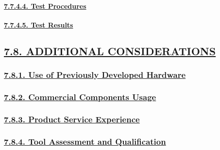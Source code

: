 \documentclass[
]{article}
\begin{document}
\hypertarget{test-procedures}{%
\paragraph{\texorpdfstring{\protect\hyperlink{test-procedures-1}{7.7.4.4.
Test Procedures}}{7.7.4.4. Test Procedures}}\label{test-procedures}}

\hypertarget{test-results}{%
\paragraph{\texorpdfstring{\protect\hyperlink{test-results-1}{7.7.4.5.
Test Results}}{7.7.4.5. Test Results}}\label{test-results}}

\hypertarget{additional-considerations}{%
\subsection{\texorpdfstring{\protect\hyperlink{additional-considerations-1}{7.8.
ADDITIONAL
CONSIDERATIONS}}{7.8. ADDITIONAL CONSIDERATIONS}}\label{additional-considerations}}

\hypertarget{use-of-previously-developed-hardware}{%
\subsubsection{\texorpdfstring{\protect\hyperlink{use-of-previously-developed-hardware-1}{7.8.1.
Use of Previously Developed
Hardware}}{7.8.1. Use of Previously Developed Hardware}}\label{use-of-previously-developed-hardware}}

\hypertarget{commercial-components-usage}{%
\subsubsection{\texorpdfstring{\protect\hyperlink{commercial-components-usage-1}{7.8.2.
Commercial Components
Usage}}{7.8.2. Commercial Components Usage}}\label{commercial-components-usage}}

\hypertarget{product-service-experience}{%
\subsubsection{\texorpdfstring{\protect\hyperlink{product-service-experience-1}{7.8.3.
Product Service
Experience}}{7.8.3. Product Service Experience}}\label{product-service-experience}}

\hypertarget{tool-assessment-and-qualification}{%
\subsubsection{\texorpdfstring{\protect\hyperlink{tool-assessment-and-qualification-1}{7.8.4.
Tool Assessment and
Qualification}}{7.8.4. Tool Assessment and Qualification}}\label{tool-assessment-and-qualification}}
\end{document}
